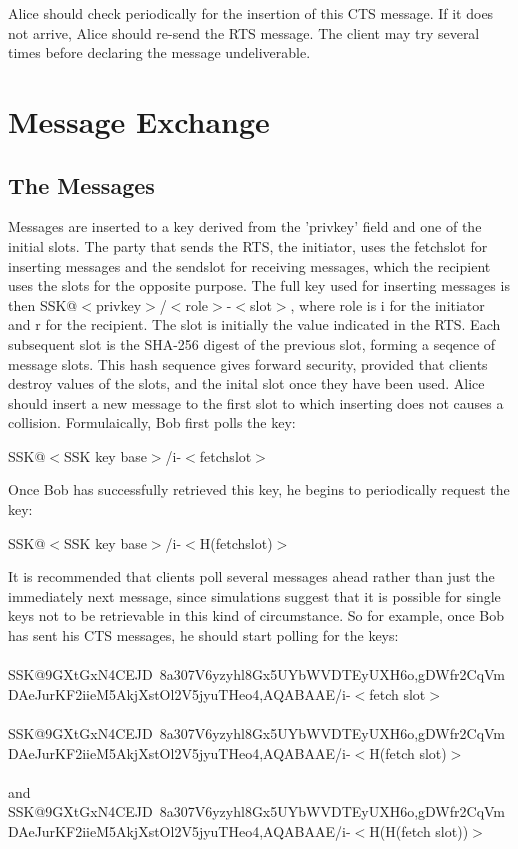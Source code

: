 \documentclass[12pt,a4paper]{article}
\begin{document}
Alice should check periodically for the insertion of this CTS message. If it does not arrive, Alice
should re-send the RTS message. The client may try several times before declaring the message
undeliverable.

\section{Message Exchange}
\subsection{The Messages}
Messages are inserted to a key derived from the 'privkey' field and one of the initial slots. The
party that sends the RTS, the initiator, uses the fetchslot for inserting messages and the sendslot
for receiving messages, which the recipient uses the slots for the opposite purpose. The full key
used for inserting messages is then SSK@$<$privkey$>$/$<$role$>$-$<$slot$>$, where role is i for the initiator
and r for the recipient. The slot is initially the value indicated in the RTS. Each subsequent
slot is the SHA-256 digest of the previous slot, forming a seqence of message slots. This hash
sequence gives forward security, provided that clients destroy values of the slots, and the inital
slot once they have been used. Alice should insert a new message to the first slot to which
inserting does not causes a collision. Formulaically, Bob first polls the key:

SSK@$<$SSK key base$>$/i-$<$fetchslot$>$

Once Bob has successfully retrieved this key, he begins to periodically request the key:

SSK@$<$SSK key base$>$/i-$<$H(fetchslot)$>$

It is recommended that clients poll several messages ahead rather than just the immediately next
message, since simulations suggest that it is possible for single keys not to be retrievable in this
kind of circumstance. So for example, once Bob has sent his CTS messages, he should start polling
for the keys: \\
\\
SSK@9GXtGxN4CEJD~8a\-307V6yzyhl8Gx5U\-YbWVDTEyUXH6o,gDWfr2CqVm\-
DAeJurKF2iieM\-5AkjXstOl2V5j\-yuTHeo4,AQABAAE/i-$<$fetch slot$>$ \\
\\
SSK@9GXtGxN4CEJD~8a\-307V6yzyhl8Gx5U\-YbWVDTEyUXH6o,gDWfr2CqVm\-
DAeJurKF2iieM\-5AkjXstOl2V5j\-yuTHeo4,AQABAAE/i-$<$H(fetch slot)$>$ \\
\\
and \\
SSK@9GXtGxN4CEJD~8a\-307V6yzyhl8Gx5U\-YbWVDTEyUXH6o,gDWfr2CqVm\-
DAeJurKF2iieM\-5AkjXstOl2V5j\-yuTHeo4,AQABAAE/i-$<$H(H(fetch slot))$>$
\end{document}
